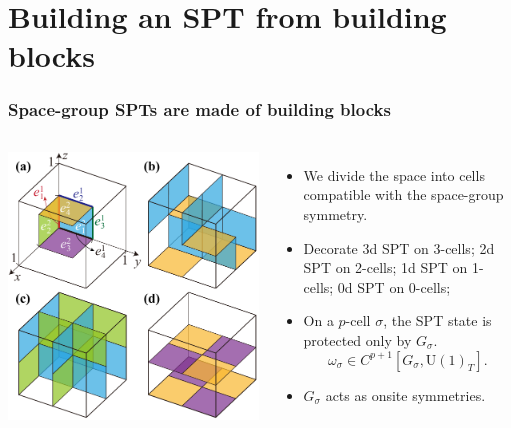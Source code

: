 \documentclass[xcolor=table, 10pt, aspectratio=43]{beamer}
\newcommand{\uone}{\mathrm U(1)}
\begin{document}
\section{Building an SPT from building blocks}
\begin{frame}
	\frametitle{Space-group SPTs are made of building blocks}
	\begin{columns}
		\begin{center}
			\includegraphics[width=\textwidth]{blocks}
		\end{center}
		\begin{itemize}
			\item We divide the space into cells compatible with the space-group symmetry.
			\item Decorate 3d SPT on 3-cells; 2d SPT on 2-cells; 1d SPT on 1-cells; 0d SPT on 0-cells;
			\item On a $p$-cell $\sigma$, the SPT state is protected only by $G_\sigma$.
			\[\omega_\sigma\in C^{p+1}[G_\sigma,\uone_T].\]
			\item $G_\sigma$ acts as onsite symmetries.
		\end{itemize}
	\end{columns}
\end{frame}
\end{document}
